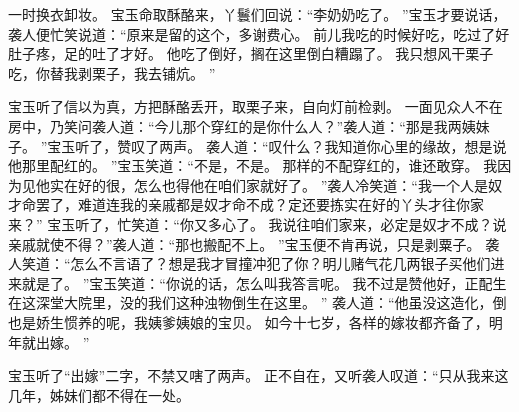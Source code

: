 一时换衣卸妆。
宝玉命取酥酪来，丫鬟们回说：“李奶奶吃了。
”宝玉才要说话，袭人便忙笑说道：“原来是留的这个，多谢费心。
前儿我吃的时候好吃，吃过了好肚子疼，足的吐了才好。
他吃了倒好，搁在这里倒白糟蹋了。
我只想风干栗子吃，你替我剥栗子，我去铺炕。
”\par
宝玉听了信以为真，方把酥酪丢开，取栗子来，自向灯前检剥。
一面见众人不在房中，乃笑问袭人道：“今儿那个穿红的是你什么人？”袭人道：“那是我两姨妹子。
”宝玉听了，赞叹了两声。
袭人道：“叹什么？我知道你心里的缘故，想是说他那里配红的。
”宝玉笑道：“不是，不是。
那样的不配穿红的，谁还敢穿。
我因为见他实在好的很，怎么也得他在咱们家就好了。
”袭人冷笑道：“我一个人是奴才命罢了，难道连我的亲戚都是奴才命不成？定还要拣实在好的丫头才往你家来？”
宝玉听了，忙笑道：“你又多心了。
我说往咱们家来，必定是奴才不成？说亲戚就使不得？”袭人道：“那也搬配不上。
”宝玉便不肯再说，只是剥粟子。
袭人笑道：“怎么不言语了？想是我才冒撞冲犯了你？明儿赌气花几两银子买他们进来就是了。
”宝玉笑道：“你说的话，怎么叫我答言呢。
我不过是赞他好，正配生在这深堂大院里，没的我们这种浊物倒生在这里。
”
袭人道：“他虽没这造化，倒也是娇生惯养的呢，我姨爹姨娘的宝贝。
如今十七岁，各样的嫁妆都齐备了，明年就出嫁。
”\par
宝玉听了“出嫁”二字，不禁又嗐了两声。
正不自在，又听袭人叹道：“只从我来这几年，姊妹们都不得在一处。
